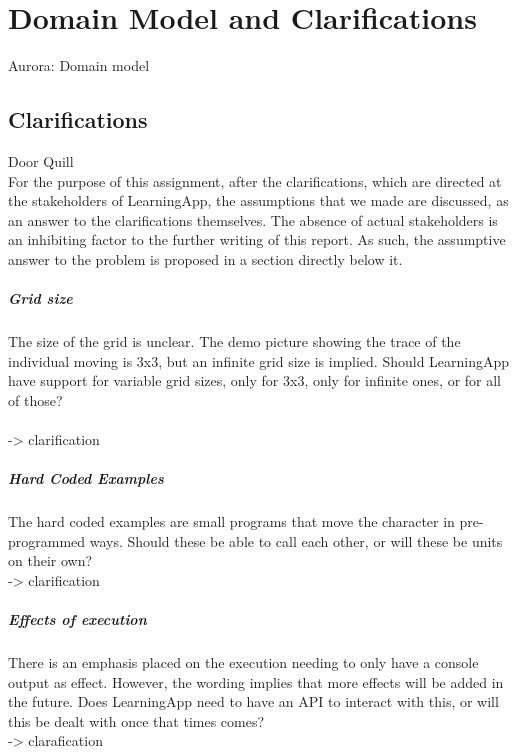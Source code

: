\chapter{Domain Model and Clarifications}
Aurora: Domain model\\


\section{Clarifications}
Door Quill\\ 

For the purpose of this assignment, after the clarifications, which are directed at the stakeholders of LearningApp, the assumptions that we made are discussed, as an answer to the clarifications themselves. The absence of actual stakeholders is an inhibiting factor to the further writing of this report. As such, the assumptive answer to the problem is proposed in a section directly below it. \\

\paragraph{Grid size}
The size of the grid is unclear. The demo picture showing the trace of the individual moving is 3x3, but an infinite grid size is implied. Should LearningApp have support for variable grid sizes, only for 3x3, only for infinite ones, or for all of those?\\~\\
-> clarification

\paragraph{Hard Coded Examples}
The hard coded examples are small programs that move the character in pre-programmed ways. Should these be able to call each other, or will these be units on their own?\\
-> clarification

\paragraph{Effects of execution}
There is an emphasis placed on the execution needing to only have a console output as effect. However, the wording implies that more effects will be added in the future. Does LearningApp need to have an API to interact with this, or will this be dealt with once that times comes?\\
-> clarafication

